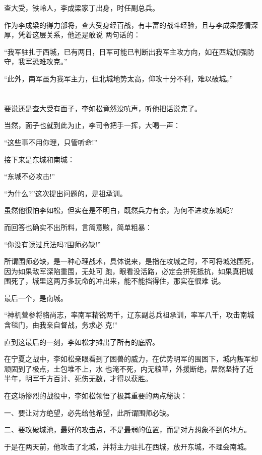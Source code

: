 \documentclass[11pt,a4paper,onecolumn]{article}
\begin{document}
查大受，铁岭人，李成梁家丁出身，时任副总兵。

作为李成梁的得力部将，查大受身经百战，有丰富的战斗经验，且与李成梁感情深厚，凭着这层关系，他还是敢说
两句话的：

``我军驻扎于西城，已有两日，日军可能已判断出我军主攻方向，如在西城加强防守，我军恐难攻克。''

``此外，南军虽为我军主力，但北城地势太高，仰攻十分不利，难以破城。''

\section[\thesection]{}

要说还是查大受有面子，李如松竟然没吭声，听他把话说完了。

当然，面子也就到此为止，李司令把手一挥，大喝一声：

``这些事不用你理，只管听命!''

接下来是东城和南城：

``东城不必攻击!''

``为什么?''这次提出问题的，是祖承训。

虽然他很怕李如松，但实在是不明白，既然兵力有余，为何不进攻东城呢?

而回答也确实不出所料，言简意赅，简单粗暴：

``你没有读过兵法吗?围师必缺!''

所谓围师必缺，是一种心理战术，具体说来，是指在攻城之时，不可将城池围死，因为如果敌军深陷重围，无处可
跑，眼看没活路，必定会拼死抵抗，如果真把城围死了，城里这两万多玩命的冲出来，能不能挡得住，那实在很难
说。

最后一个，是南城。

``神机营参将骆尚志，率南军精锐两千，辽东副总兵祖承训，率军八千，攻击南城含毯门，由我亲自督战，务求必
克!''

直到这最后的一刻，李如松才摊出了所有的底牌。

在宁夏之战中，李如松亲眼看到了困兽的威力，在优势明军的围困下，城内叛军却顽固到了极点，土包堆不上，水
也淹不死，内无粮草，外援断绝，居然坚持了近半年，明军千方百计、死伤无数，才得以获胜。

在这场惨烈的战役中，李如松领悟了极其重要的两点秘诀：

一、要让对方绝望，必先给他希望，此所谓围师必缺。

二、要攻破城池，最好的攻击点，不是最弱的位置，而是对方想象不到的地方。

于是在两天前，他攻击了北城，并将主力驻扎在西城，放开东城，不理会南城。
\end{document}
